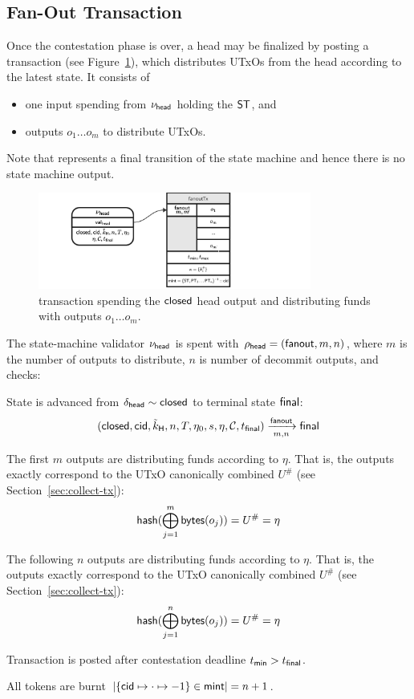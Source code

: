 \subsection{Fan-Out Transaction}

Once the contestation phase is over, a head may be finalized by posting a
\mtxFanout{} transaction (see Figure~\ref{fig:fanoutTx}), which
distributes UTxOs from the head according to the latest state. It consists of
\begin{itemize}
	\item one input spending from $\nu_\mathsf{head}$ holding the $\mathsf{ST}$, and
	\item outputs $o_{1} \dots o_{m}$ to distribute UTxOs.
\end{itemize}

Note that \mtxFanout{} represents a final transition of the state machine and
hence there is no state machine output.

\begin{figure}
	\centering
	\includegraphics[width=0.8\textwidth]{figures/fanoutTx.pdf}
	\caption{\mtxFanout{} transaction spending the $\mathsf{closed}$ head output and
		distributing funds with outputs $o_{1} \dots o_{m}$.}\label{fig:fanoutTx}
\end{figure}

\noindent The state-machine validator $\nu_\mathsf{head}$ is spent with
$\rho_{\mathsf{head}} = (\mathsf{fanout}, m, n)$, where $m$ is the number of outputs to
distribute, $n$ is number of decommit outputs, and checks:
\begin{menumerate}
	\item State is advanced from $\delta_{\mathsf{head}} \sim \mathsf{closed}$ to terminal state
	$\mathsf{final}$: %
	\[
		(\mathsf{closed},\mathsf{cid},\tilde{k}_{\mathsf{H}},n,T,\eta_0,s,\eta,\mathcal{C},t_{\mathsf{final}}) \xrightarrow[m,n]{\mathsf{fanout}} \mathsf{final}
	\]
	\item The first $m$ outputs are distributing funds according to
	$\eta$. That is, the outputs exactly correspond to the UTxO
	canonically combined $U^{\#}$ (see Section~\ref{sec:collect-tx}):
	\[
		\mathsf{hash}(\bigoplus_{j=1}^{m} \mathsf{bytes}(o_{j})) = U^{\#} = \eta
	\]
	\item The following $n$ outputs are distributing funds according to
	$\eta$. That is, the outputs exactly correspond to the UTxO
	canonically combined $U^{\#}$ (see Section~\ref{sec:collect-tx}):
	\[
		\mathsf{hash}(\bigoplus_{j=1}^{n} \mathsf{bytes}(o_{j})) = U^{\#} = \eta
	\]
	\item Transaction is posted after contestation deadline $t_{\mathsf{min}} > t_{\mathsf{final}}$.
	\item All tokens are burnt
	$|\{\mathsf{cid} \mapsto \cdot \mapsto -1\} \in \mathsf{mint}| = n + 1$.
\end{menumerate}

